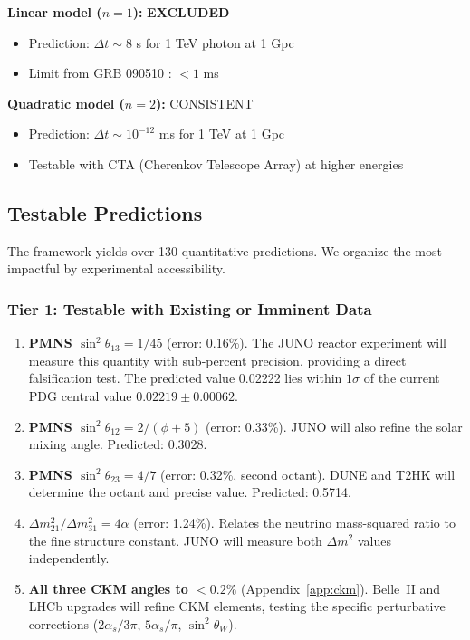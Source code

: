 \documentclass[12pt,a4paper]{article}
\begin{document}
\textbf{Linear model ($n=1$):} \textbf{EXCLUDED}
\begin{itemize}
    \item Prediction: $\Delta t \sim 8$ s for 1 TeV photon at 1 Gpc
    \item Limit from GRB 090510 \cite{fermi2009}: $< 1$ ms
\end{itemize}

\textbf{Quadratic model ($n=2$):} CONSISTENT
\begin{itemize}
    \item Prediction: $\Delta t \sim 10^{-12}$ ms for 1 TeV at 1 Gpc
    \item Testable with CTA (Cherenkov Telescope Array) at higher energies
\end{itemize}

\subsection{Testable Predictions}
\label{sec:testable}

The framework yields over 130 quantitative predictions. We organize the most impactful by experimental accessibility.

\subsubsection{Tier 1: Testable with Existing or Imminent Data}

\begin{enumerate}
    \item \textbf{PMNS $\sin^2\theta_{13} = 1/45$} (error: 0.16\%). The JUNO reactor experiment will measure this quantity with sub-percent precision, providing a direct falsification test. The predicted value 0.02222 lies within $1\sigma$ of the current PDG central value $0.02219 \pm 0.00062$.

    \item \textbf{PMNS $\sin^2\theta_{12} = 2/(\phi+5)$} (error: 0.33\%). JUNO will also refine the solar mixing angle. Predicted: 0.3028.

    \item \textbf{PMNS $\sin^2\theta_{23} = 4/7$} (error: 0.32\%, second octant). DUNE and T2HK will determine the octant and precise value. Predicted: 0.5714.

    \item \textbf{$\Delta m^2_{21}/\Delta m^2_{31} = 4\alpha$} (error: 1.24\%). Relates the neutrino mass-squared ratio to the fine structure constant. JUNO will measure both $\Delta m^2$ values independently.

    \item \textbf{All three CKM angles to $< 0.2\%$} (Appendix~\ref{app:ckm}). Belle~II and LHCb upgrades will refine CKM elements, testing the specific perturbative corrections ($2\alpha_s/3\pi$, $5\alpha_s/\pi$, $\sin^2\theta_W$).
\end{enumerate}
\end{document}
